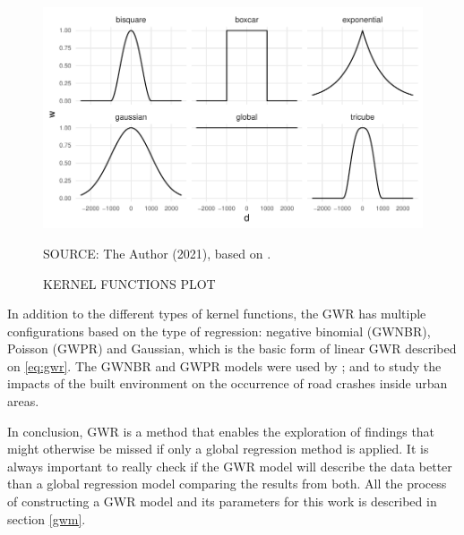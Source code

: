 \vspace{\baselineskip}

\begin{figure}[!htbp]
    \centering\footnotesize
    \captionsetup{font=footnotesize}
    \caption{KERNEL FUNCTIONS PLOT}
    \includegraphics{fig/kernel.pdf}
    \label{fig:kernel}
    \par SOURCE: The Author (2021), based on \textcite{Gollini2013}.
\end{figure}

\vspace{\baselineskip}

In addition to the different types of kernel functions, the GWR has multiple configurations based on the type of regression: negative binomial (GWNBR), Poisson (GWPR) and Gaussian, which is the basic form of linear GWR described on  \autoref{eq:gwr}. The GWNBR and GWPR models were used by \textcite{Obelheiro2019}; \textcite{Obelheiro2020} and \textcite{Yu2017} to study the impacts of the built environment on the occurrence of road crashes inside urban areas. %

In conclusion, GWR is a method that enables the exploration of findings that might otherwise be missed if only a global regression method is applied. It is always important to really check if the GWR model will describe the data better than a global regression model comparing the results from both. All the process of constructing a GWR model and its parameters for this work is described in section \ref{gwm}.


